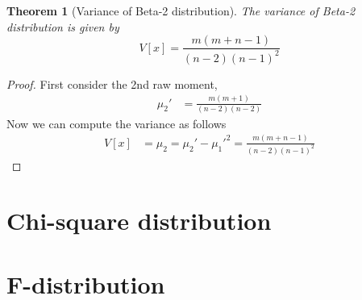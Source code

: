 \documentclass[oneside,11pt,pdftex]{book}%
\numberwithin{equation}{section}
\newtheorem{theorem}{Theorem}[chapter]%
\numberwithin{section}{chapter}
\numberwithin{equation}{chapter}
\begin{document}
\begin{theorem}[Variance of Beta-2 distribution]
	The variance of Beta-2 distribution is given by \[ V[x]=\frac{m(m+n-1)}{(n-2)(n-1)^2} \]
\end{theorem}
\begin{proof}
	First consider the 2nd raw moment,
	\begin{align*}
		\mu_2'&=\frac{m(m+1)}{(n-2)(n-2)}
	\end{align*}
	Now we can compute the variance as follows
	\begin{align*}
		V[x]&=\mu_2=\mu_2'-\mu_1'^2=\frac{m(m+n-1)}{(n-2)(n-1)^2}
	\end{align*}
\end{proof}



\chapter{Chi-square distribution}



\chapter{F-distribution}


\backmatter


\thispagestyle{empty}%
{\ }
\newpage
\end{document}
